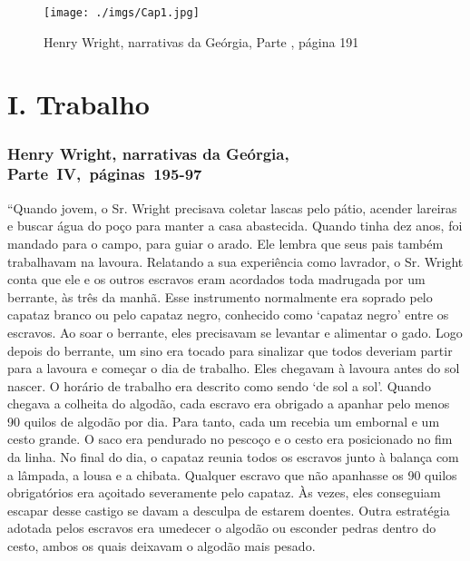 \pagebreak
\thispagestyle{empty}

\begin{absolutelynopagebreak}
\begin{vplace}
\begin{figure}[H]
\begin{adjustwidth}{-1.8cm}{}
  \vspace*{-2cm}
  \texttt{[image: ./imgs/Cap1.jpg]}  
\end{adjustwidth}
  \caption{Henry Wright, narrativas da Geórgia, Parte , página 191}
\end{figure}
\end{vplace}

\end{absolutelynopagebreak}

\chapter{I. Trabalho}

\subsection{Henry Wright, narrativas da Geórgia, Parte~IV,~páginas~195-97}
\label{ref316}

``Quando jovem, o Sr. Wright precisava coletar lascas pelo pátio,
acender lareiras e buscar água do poço para manter a casa abastecida.
Quando tinha dez anos, foi mandado para o campo, para guiar o arado. Ele
lembra que seus pais também trabalhavam na lavoura. Relatando a sua
experiência como lavrador, o Sr. Wright conta que ele e os outros
escravos eram acordados toda madrugada por um berrante, às três da
manhã. Esse instrumento normalmente era soprado pelo capataz branco ou
pelo capataz negro, conhecido como `capataz negro' entre os escravos. Ao
soar o berrante, eles precisavam se levantar e alimentar o gado. Logo
depois do berrante, um sino era tocado para sinalizar que todos deveriam
partir para a lavoura e começar o dia de trabalho. Eles chegavam à
lavoura antes do sol nascer. O horário de trabalho era descrito como
sendo `de sol a sol'. Quando chegava a colheita do algodão, cada escravo
era obrigado a apanhar pelo menos 90 quilos de algodão por dia. Para tanto,
cada um recebia um embornal e um cesto grande. O saco era pendurado no
pescoço e o cesto era posicionado no fim da linha. No final do dia, o
capataz reunia todos os escravos junto à balança com a lâmpada, a lousa
e a chibata. Qualquer escravo que não apanhasse os 90 quilos obrigatórios
era açoitado severamente pelo capataz. Às vezes, eles conseguiam escapar
desse castigo se davam a desculpa de estarem doentes. Outra estratégia
adotada pelos escravos era umedecer o algodão ou esconder pedras dentro
do cesto, ambos os quais deixavam o algodão mais pesado.

